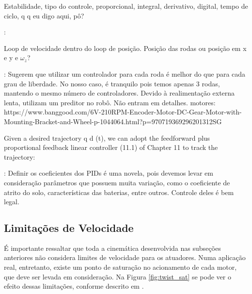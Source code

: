 Estabilidade, tipo do controle, proporcional, integral, derivativo, digital, tempo de ciclo, q q eu digo aqui, pô?

\citet{lynch2017modern}:

Loop de velocidade dentro do loop de posição. Posição das rodas ou posição em x e y e $\omega_z$?



\citet{rojas2006holonomic}: Sugerem que utilizar um controlador para cada roda é melhor do que para cada grau de liberdade. No nosso caso, é tranquilo pois temos apenas 3 rodas, mantendo o mesmo número de controladores. Devido à realimentação externa lenta, utilizam um preditor no robô. Não entram em detalhes.
motores:
https://www.banggood.com/6V-210RPM-Encoder-Motor-DC-Gear-Motor-with-Mounting-Bracket-and-Wheel-p-1044064.html?p=970719369296201312SG

Given a desired trajectory q d (t), we can adopt the feedforward plus proportional feedback linear controller (11.1) of Chapter 11 to track the trajectory: \cite{lynch2017modern}

\cite{samani2007comprehensive}: Definir os coeficientes dos PIDs é uma novela, pois devemos levar em consideração parâmetros que possuem muita variação, como o coeficiente de atrito do solo, características das baterias, entre outros. Controle deles é bem legal.



\subsection{Limitações de Velocidade}

É importante ressaltar que toda a cinemática desenvolvida nas subseções anteriores não considera limites de velocidade para os atuadores. Numa aplicação real, entretanto, existe um ponto de saturação no acionamento de cada motor, que deve ser levada em consideração. Na Figura \ref{fig:twist_sat} se pode ver o efeito dessas limitações, conforme descrito em \citet{lynch2017modern}.

